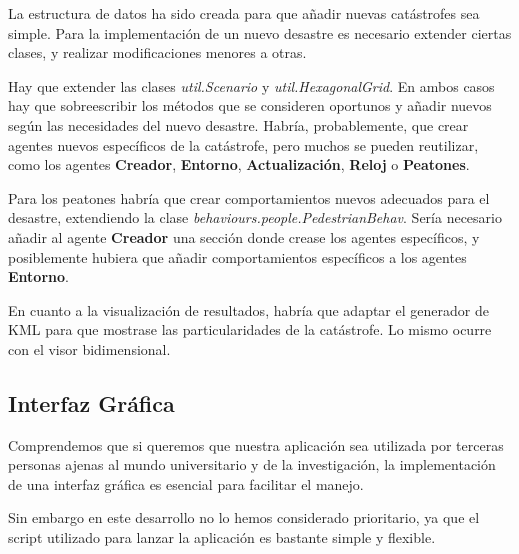 La estructura de datos ha sido creada para que añadir nuevas catástrofes sea
simple. Para la implementación de un nuevo desastre es necesario extender
ciertas clases, y realizar modificaciones menores a otras.

Hay que extender las clases {\em util.Scenario} y {\em util.HexagonalGrid}. En
ambos casos hay que sobreescribir los métodos que se consideren oportunos y
añadir nuevos según las necesidades del nuevo desastre. Habría, probablemente,
que crear agentes nuevos específicos de la catástrofe, pero muchos se pueden
reutilizar, como los agentes {\bf Creador}, {\bf Entorno}, {\bf Actualización},
{\bf Reloj} o {\bf Peatones}.

Para los peatones habría que crear comportamientos nuevos adecuados para el
desastre, extendiendo la clase {\em behaviours.people.PedestrianBehav}. Sería
necesario añadir al agente {\bf Creador} una sección donde crease los agentes
específicos, y posiblemente hubiera que añadir comportamientos específicos a
los agentes {\bf Entorno}.

En cuanto a la visualización de resultados, habría que adaptar el generador de
KML para que mostrase las particularidades de la catástrofe. Lo mismo ocurre
con el visor bidimensional.

\subsection{Interfaz Gráfica}

Comprendemos que si queremos que nuestra aplicación sea utilizada por terceras
personas ajenas al mundo universitario y de la investigación, la implementación
de una interfaz gráfica es esencial para facilitar el manejo.

Sin embargo en este desarrollo no lo hemos considerado prioritario, ya que
el script utilizado para lanzar la aplicación es bastante simple y flexible.

